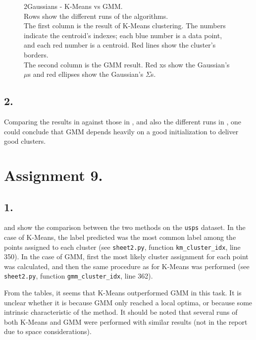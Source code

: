 \documentclass[a4paper,11pt]{article}
\begin{document}
\begin{figure}
\begin{subfigure}[b]{0.45\textwidth}
    \end{subfigure}
        \caption{\small{2Gaussians - K-Means vs GMM.
                \\ Rows show the different runs of the algorithms.
                \\The first column is the result of K-Means clustering. The numbers indicate the centroid's indexes; each blue number is a data point, and each red number is a centroid. Red lines show the cluster's borders.
                \\The second column is the GMM result. Red xs show the Gaussian's $\mu$s and red ellipses show the Gaussian's $\Sigma$s.}}
    \label{fig:assignment8}
\end{figure}

\subsection*{2.}

Comparing the results in  against those in , and also the different runs in , one could conclude that GMM depends heavily on a good initialization to deliver good clusters.

\section*{Assignment 9.}
\subsection*{1.}

 and  show the comparison between the two methods on the \verb|usps| dataset. In the case of K-Means, the label predicted was the most common label among the points assigned to each cluster (see \verb|sheet2.py|, function \verb|km_cluster_idx|, line 350). In the case of GMM, first the most likely cluster assignment for each point was calculated, and then the same procedure as for K-Means was performed (see \verb|sheet2.py|, function \verb|gmm_cluster_idx|, line 362).

From the tables, it seems that K-Means outperformed GMM in this task. It is unclear whether it is because GMM only reached a local optima, or because some intrinsic characteristic of the method. It should be noted that several runs of both K-Means and GMM were performed with similar results (not in the report due to space considerations).
\end{document}
